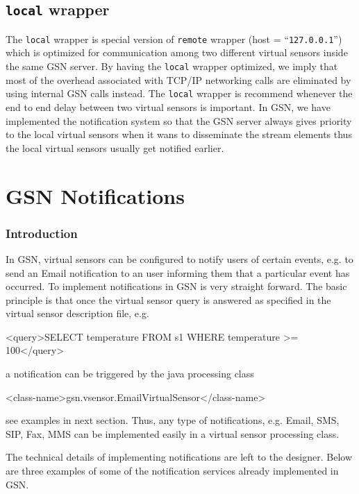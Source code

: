 \subsection{\texttt{local} wrapper}
The \verb|local| wrapper is special version of \texttt{remote} wrapper (host = ``\texttt{127.0.0.1}'') which is optimized
for communication among two different virtual sensors inside the same GSN server. By having the
\texttt{local} wrapper optimized, we imply that most of the overhead associated with TCP/IP networking
calls are eliminated by using internal GSN calls instead. The \texttt{local} wrapper is recommend whenever
the end to end delay between two virtual sensors is important. In GSN, we have implemented the 
notification system so that the GSN server always gives priority to the local virtual sensors when it wans to disseminate
the stream elements thus the local virtual sensors usually get notified earlier.


\section{GSN Notifications}

\subsubsection{Introduction}

In GSN, virtual sensors can be configured to notify users of certain events, e.g. to send an Email notification to an user informing them that a particular event has occurred. To implement notifications in GSN is very straight forward. The basic principle is that once the virtual sensor query is answered as specified in the virtual sensor description file, e.g.

\begin{xmlcode}
<query>SELECT temperature FROM s1 WHERE temperature >= 100</query>
\end{xmlcode}

a notification can be triggered  by the java processing class

\begin{xmlcode}
<class-name>gsn.vsensor.EmailVirtualSensor</class-name>
\end{xmlcode}

see examples in next section. Thus, any type of notifications, e.g. Email, SMS, SIP, Fax, MMS can be implemented easily in a virtual sensor processing class. 

The technical details of implementing notifications are left to the designer. Below are three examples of some of the notification services already implemented in GSN.

